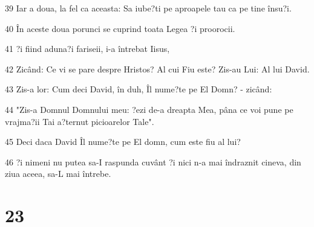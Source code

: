 \par 39 Iar a doua, la fel ca aceasta: Sa iube?ti pe aproapele tau ca pe tine însu?i.
\par 40 În aceste doua porunci se cuprind toata Legea ?i proorocii.
\par 41 ?i fiind aduna?i fariseii, i-a întrebat Iisus,
\par 42 Zicând: Ce vi se pare despre Hristos? Al cui Fiu este? Zis-au Lui: Al lui David.
\par 43 Zis-a lor: Cum deci David, în duh, Îl nume?te pe El Domn? - zicând:
\par 44 "Zis-a Domnul Domnului meu: ?ezi de-a dreapta Mea, pâna ce voi pune pe vrajma?ii Tai a?ternut picioarelor Tale".
\par 45 Deci daca David Îl nume?te pe El domn, cum este fiu al lui?
\par 46 ?i nimeni nu putea sa-I raspunda cuvânt ?i nici n-a mai îndraznit cineva, din ziua aceea, sa-L mai întrebe.

\chapter{23}

